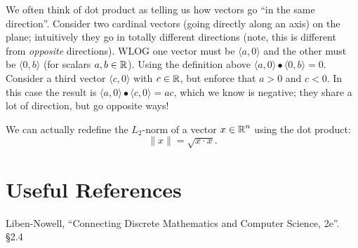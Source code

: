 We often think of dot product as telling us how vectors go ``in the same direction''. 
Consider two cardinal vectors (going directly along an axis) on the plane;
intuitively they go in totally different directions (note, this is different from \textit{opposite} directions). 
WLOG one vector must be $\langle a, 0 \rangle$ and the other must be  $\langle 0,b \rangle$ (for scalars $a,b\in\operatorname{\mathbb{R}}$). 
Using the definition above $\langle a, 0 \rangle \bullet \langle 0,b \rangle = 0$.
Consider a third vector $\langle c, 0 \rangle$ with $c\in\operatorname{\mathbb{R}}$, but enforce that $a > 0$ and $c < 0$. 
In this case the result is $\langle a, 0 \rangle \bullet \langle c,0 \rangle = ac$, which we know is negative; 
they share a lot of direction, but go opposite ways! 

We can actually redefine the $L_2$-norm of a vector $x\in\operatorname{\mathbb{R}}^n$ using the dot product:
\[
\|x\| = \sqrt{x \cdot x}.
\]

\section*{Useful References}
Liben-Nowell, ``Connecting Discrete Mathematics and Computer Science, 2e''. \S 2.4

